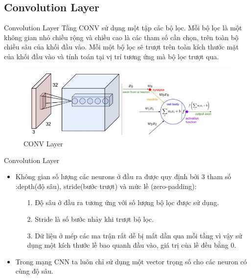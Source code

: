 \documentclass[compress]{beamer}
\begin{document}
\subsection{Convolution Layer}
\begin{frame}{Convolution Layer}
Tầng CONV sử dụng một tập các bộ lọc. Mỗi bộ lọc là một không gian nhỏ chiều rộng và chiều cao là các tham số cần chọn, trên toàn bộ chiều sâu của khối đầu vào. Mỗi một bộ lọc sẽ trượt trên toàn kích thước mặt của khối đầu vào và tính toán tại vị trí tương ứng mà bộ lọc trượt qua.
\begin{figure}[H]
\includegraphics[scale=0.5]{img2.png}
\caption{CONV Layer}
\end{figure}

\end{frame}
\begin{frame}{Convolution Layer}
\begin{itemize}
\item	Không gian số lượng các neurons ở đầu ra được quy định bởi 3 tham số :depth(độ sâu), stride(bước trượt) và mức lề (zero-padding):
\begin{itemize}
\item[1. ] Độ sâu ở đầu ra tương ứng với số lượng bộ lọc được sử dụng.
\item[2. ] Stride là số bước nhảy khi trượt bộ lọc.
\item[3. ] Dữ liệu ở mép các ma trận rất dễ bị mất  dần qua mỗi tầng vì vậy sử dụng một kích thước lề bao quanh đầu vào, giá trị của lề đều bằng 0. 

\end{itemize} 
\item Trong mạng CNN ta luôn chỉ sử dụng một vector trọng số cho các neuron có cùng độ sâu.
\end{itemize}
\end{frame}
\end{document}
